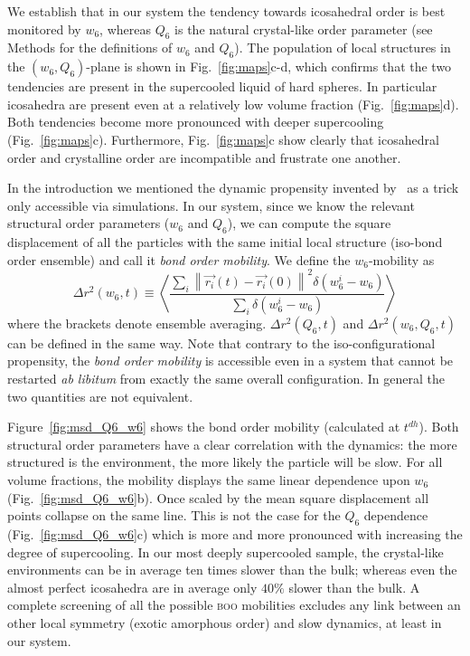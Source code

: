 We establish that in our system the tendency towards icosahedral order is best monitored by $w_6$, whereas $Q_6$ is the natural crystal-like order parameter (see Methods for the definitions of $w_6$ and $Q_6$). The population of local structures in the $(w_6,Q_6)$-plane is shown in Fig.~\ref{fig:maps}c-d, which confirms that the two tendencies are present in the supercooled liquid of hard spheres. In particular icosahedra are present even at a relatively low volume fraction (Fig.~\ref{fig:maps}d). Both tendencies become more pronounced with deeper supercooling (Fig.~\ref{fig:maps}c). Furthermore, Fig.~\ref{fig:maps}c show clearly that icosahedral order and crystalline order are incompatible and frustrate one another.



In the introduction we mentioned the dynamic propensity invented by~\citet{Widmer-Cooper2005} as a trick only accessible via simulations. In our system, since we know the relevant structural order parameters ($w_6$ and $Q_6$), we can compute the square displacement of all the particles with the same initial local structure (iso-bond order ensemble) and call it \emph{bond order mobility}. We define the $w_6$-mobility as
\begin{equation}
	\Delta r^2(w_6, t) \equiv \left\langle \frac{
		\sum\limits_i{
			\left\|\vec{r_i}(t)-\vec{r_i}(0)\right\|^2 \delta(w_6^i-w_6)
			}
	}{
		\sum\limits_i{\delta(w_6^i-w_6)}
	}\right\rangle 
	\label{eq:bo_propensity}
\end{equation}
where the brackets denote ensemble averaging. $\Delta r^2(Q_6, t)$ and $\Delta r^2(w_6, Q_6, t)$ can be defined in the same way. Note that contrary to the iso-configurational propensity, the \emph{bond order mobility} is accessible even in a system that cannot be restarted \emph{ab libitum} from exactly the same overall configuration. In general the two quantities are not equivalent.

Figure~\ref{fig:msd_Q6_w6} shows the bond order mobility (calculated at $t^{dh}$). Both structural order parameters have a clear correlation with the dynamics: the more structured is the environment, the more likely the particle will be slow. For all volume fractions, the mobility displays the same linear dependence upon $w_6$ (Fig.~\ref{fig:msd_Q6_w6}b). Once scaled by the mean square displacement all points collapse on the same line. This is not the case for the $Q_6$ dependence (Fig.~\ref{fig:msd_Q6_w6}c) which is more and more pronounced with increasing the degree of supercooling. In our most deeply supercooled sample, the crystal-like environments can be in average ten times slower than the bulk; whereas even the almost perfect icosahedra are in average only $40\%$ slower than the bulk. A complete screening of all the possible \textsc{boo} mobilities excludes any link between an other local symmetry (exotic amorphous order) and slow dynamics, at least in our system.

